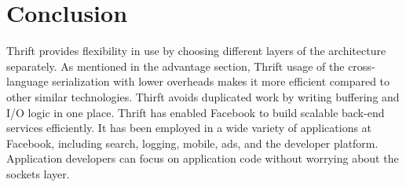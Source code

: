 \documentclass[9pt,twocolumn,twoside]{../../styles/osajnl}
\begin{document}
\section{Conclusion}
Thrift provides flexibility in use by choosing different layers of the architecture separately. As mentioned in the advantage section, Thrift usage of the cross-language serialization with lower overheads makes it more efficient compared to other similar technologies. Thirft avoids duplicated work by writing buffering and I/O logic in one place. Thrift has enabled Facebook to build scalable back-end services efficiently. It has been employed in a wide variety of applications at Facebook, including search, logging, mobile, ads, and the developer platform. Application developers can focus on application code without worrying about the sockets layer.


\end{document}
